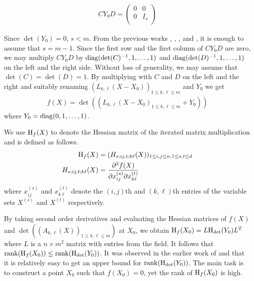 \begin{align*}
  CY_0D =
  \begin{pmatrix}
    0& 0\\
    0& I_s\\
  \end{pmatrix}
\end{align*}

Since $\det(Y_0)=0$, $s<m$. From the previous works \cite{von1987}, \cite{cai1990}, \cite{mt2004}, and \cite{ccl2008}, it is enough to assume that $s=m-1$. Since the first row and the first column of $CY_0D$ are zero, we may multiply $CY_0D$ by $\mathrm{diag}(\det(C)^{-1},1,\dots,1)$ and $\mathrm{diag}(\det(D)^{-1},1,\dots,1)$ on the left and the right side. Without loss of generality, we may assume that $\det(C)=\det(D)=1$. By multiplying with $C$ and $D$ on the left and the right and suitably renaming $(L_{k,\ell}(X-X_0))_{1\leq k,\ell\leq m}$ and $Y_0$ we get
\begin{align*}
  f(X) = \det((L_{k,\ell}(X-X_0)_{1\leq k,\ell\leq m} + Y_0))
\end{align*}
where $Y_0 = \mathrm{diag}(0,1,\dots,1)$. 

We use $\mathrm{H}_{f}(X)$ to denote the Hessian matrix of the iterated matrix multiplication and is defined as follows.
\begin{align*}
  \mathrm{H}_{f}(X) &= (H_{s;ij,t;k\ell}(X))_{1\leq i,j\leq n, 1\leq s,t \leq d }\\
  H_{s;ij,t;k\ell}(X) &= \frac{\partial^2f(X)}{\partial x_{ij}^{(s)}\partial x_{k\ell}^{(t)}}
\end{align*}
where $x_{ij}^{(s)}$ and $x_{k\ell}^{(t)}$  denote the $(i,j)$th and $(k,\ell)$th entries of the variable sets $X^{(s)}$ and $X^{(t)}$ respectively. 

By taking second order derivatives and evaluating the Hessian matrices of $f(X)$ and $\det((A_{k,\ell}(X))_{1\leq k,\ell\leq m})$ at $X_0$, we obtain $\mathrm{H}_{f}(X_0) = L\mathrm{H}_{\det}(Y_0)L^{T}$ where $L$ is a $n\times m^2$ matrix with entries from the field. It follows that $\mathrm{rank}(\mathrm{H}_{f}(X_0)) \leq \mathrm{rank}(\mathrm{H}_{\det}(Y_0))$. It was observed in the earlier work  of \cite{mt2004} and \cite{ccl2008} that it is relatively easy to get an upper bound for $\mathrm{rank}(\mathrm{H}_{\det}(Y_0))$. 
The main task is to construct a point $X_0$ such that $f(X_0)=0$, yet the rank of $\mathrm{H}_{f}(X_0)$ is high. 